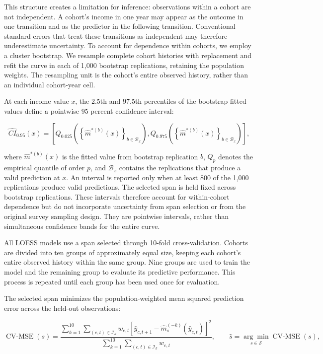 \documentclass{article}
\begin{document}
This structure creates a limitation for inference: observations within a cohort are not independent. A cohort's income in one year may appear as the outcome in one transition and as the predictor in the following transition. Conventional standard errors that treat these transitions as independent may therefore underestimate uncertainty. To account for dependence within cohorts, we employ a cluster bootstrap. We resample complete cohort histories with replacement and refit the curve in each of 1,000 bootstrap replications, retaining the population weights. The resampling unit is the cohort's entire observed history, rather than an individual cohort-year cell.

At each income value $x$, the 2.5th and 97.5th percentiles of the bootstrap fitted values define a pointwise 95 percent confidence interval:

\begin{equation}
    \widehat{CI}_{0.95}(x)
    =
    \left[
        Q_{0.025}\left(
            \left\{\hat{m}^{*(b)}(x)\right\}_{b\in\mathcal{B}_x}
        \right),
        Q_{0.975}\left(
            \left\{\hat{m}^{*(b)}(x)\right\}_{b\in\mathcal{B}_x}
        \right)
    \right],
    \label{eq:bootstrap_ci}
\end{equation}

where $\hat{m}^{*(b)}(x)$ is the fitted value from bootstrap replication $b$, $Q_p$ denotes the empirical quantile of order $p$, and $\mathcal{B}_x$ contains the replications that produce a valid prediction at $x$. An interval is reported only when at least 800 of the 1,000 replications produce valid predictions. The selected span is held fixed across bootstrap replications. These intervals therefore account for within-cohort dependence but do not incorporate uncertainty from span selection or from the original survey sampling design. They are pointwise intervals, rather than simultaneous confidence bands for the entire curve.

All LOESS models use a span selected through 10-fold cross-validation. Cohorts are divided into ten groups of approximately equal size, keeping each cohort's entire observed history within the same group. Nine groups are used to train the model and the remaining group to evaluate its predictive performance. This process is repeated until each group has been used once for evaluation.

The selected span minimizes the population-weighted mean squared prediction error across the held-out observations:

\begin{equation}
    \operatorname{CV\text{-}MSE}(s)
    =
    \frac{
        \displaystyle\sum_{k=1}^{10}
        \sum_{(c,t)\in\mathcal{I}_k}
        w_{c,t}
        \left[
            \bar{y}_{c,t+1}
            -
            \hat{m}_{s}^{(-k)}(\bar{y}_{c,t})
        \right]^2
    }{
        \displaystyle\sum_{k=1}^{10}
        \sum_{(c,t)\in\mathcal{I}_k} w_{c,t}
    },
    \qquad
    \hat{s}
    =
    \underset{s\in\mathcal{S}}{\arg\min}
    \operatorname{CV\text{-}MSE}(s),
    \label{eq:cv_mse}
\end{equation}
\end{document}
